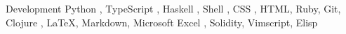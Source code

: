 \begin{cvskills}
	\cvskill
	{Development} %
	{Python , TypeScript , Haskell , Shell , CSS , HTML, Ruby, Git, Clojure , LaTeX, Markdown, Microsoft Excel , Solidity, Vimscript, Elisp} %

\end{cvskills}

